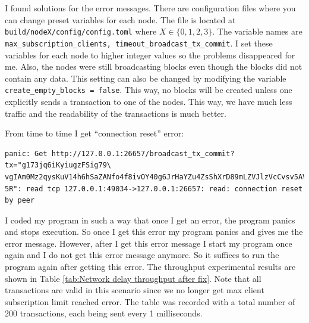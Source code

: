 \documentclass{article}
\begin{document}
I found solutions for the error messages. There are configuration files where you can change preset variables for each node. The file is located at \texttt{build/nodeX/config/config.toml} where $X \in \{0,1,2,3\}$. The variable names are \texttt{max\_subscription\_clients, timeout\_broadcast\_tx\_commit}. I set these variables for each node to higher integer values so the problems disappeared for me. Also, the nodes were still broadcasting blocks even though the blocks did not contain any data. This setting can also be changed by modifying the variable \texttt{create\_empty\_blocks = false}. This way, no blocks will be created unless one explicitly sends a transaction to one of the nodes. This way, we have much less traffic and the readability of the transactions is much better.

From time to time I get ``connection reset'' error: 

\begin{verbatim}
panic: Get http://127.0.0.1:26657/broadcast_tx_commit?tx="g173jq6iKyiugzFSig79\
vgIAm0Mz2qysKuV14h6hSaZANfo4f8ivOY40g6JrHaYZu4ZsShXrD89mLZVJlzVcCvsv5AVO5WbTGQ\
5R": read tcp 127.0.0.1:49034->127.0.0.1:26657: read: connection reset by peer
\end{verbatim}

I coded my program in such a way that once I get an error, the program panics and stops execution. So once I get this error my program panics and gives me the error message. However, after I get this error message I start my program once again and I do not get this error message anymore. So it suffices to run the program again after getting this error. The throughput experimental results are shown in Table \ref{tab:Network delay throughput after fix}. Note that all transactions are valid in this scenario since we no longer get max client subscription limit reached error. The table was recorded with a total number of 200 transactions, each being sent every 1 milliseconds.
\end{document}

